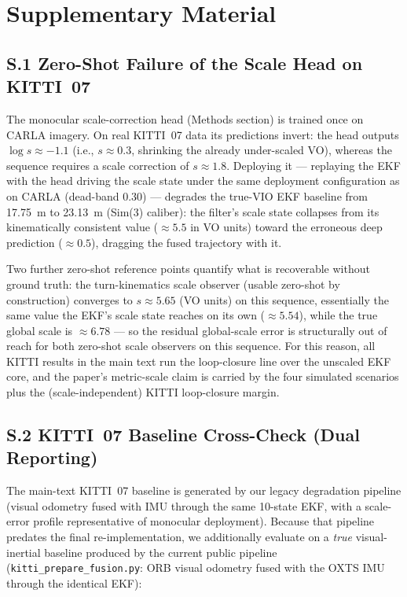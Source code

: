 
\section*{Supplementary Material}
\label{sec:supplementary}

\subsection*{S.1 Zero-Shot Failure of the Scale Head on KITTI~07}

The monocular scale-correction head (Methods section) is trained once on CARLA imagery. On real KITTI~07 data its predictions invert: the head outputs $\log s \approx -1.1$ (i.e., $s\approx0.3$, shrinking the already under-scaled VO), whereas the sequence requires a scale correction of $s\approx1.8$. Deploying it --- replaying the EKF with the head driving the scale state under the same deployment configuration as on CARLA (dead-band $0.30$) --- degrades the true-VIO EKF baseline from 17.75~m to 23.13~m (Sim(3) caliber): the filter's scale state collapses from its kinematically consistent value ($\approx5.5$ in VO units) toward the erroneous deep prediction ($\approx0.5$), dragging the fused trajectory with it.

Two further zero-shot reference points quantify what is recoverable without ground truth: the turn-kinematics scale observer (usable zero-shot by construction) converges to $s\approx5.65$ (VO units) on this sequence, essentially the same value the EKF's scale state reaches on its own ($\approx5.54$), while the true global scale is $\approx6.78$ --- so the residual global-scale error is structurally out of reach for both zero-shot scale observers on this sequence. For this reason, all KITTI results in the main text run the loop-closure line over the unscaled EKF core, and the paper's metric-scale claim is carried by the four simulated scenarios plus the (scale-independent) KITTI loop-closure margin.

\subsection*{S.2 KITTI~07 Baseline Cross-Check (Dual Reporting)}

The main-text KITTI~07 baseline is generated by our legacy degradation pipeline (visual odometry fused with IMU through the same 10-state EKF, with a scale-error profile representative of monocular deployment). Because that pipeline predates the final re-implementation, we additionally evaluate on a \emph{true} visual-inertial baseline produced by the current public pipeline (\texttt{kitti\_prepare\_fusion.py}: ORB visual odometry fused with the OXTS IMU through the identical EKF):

